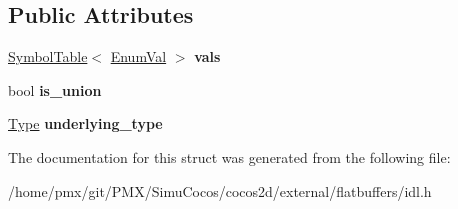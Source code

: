 \subsection*{Public Attributes}
\begin{DoxyCompactItemize}
\item 
\mbox{\label{structflatbuffers_1_1EnumDef_a3a7774d056864d4972b145df38910c8b}} 
\hyperlink{classflatbuffers_1_1SymbolTable}{Symbol\+Table}$<$ \hyperlink{structflatbuffers_1_1EnumVal}{Enum\+Val} $>$ {\bfseries vals}
\item 
\mbox{\label{structflatbuffers_1_1EnumDef_a70fa57575bf631dcc2860604574fd336}} 
bool {\bfseries is\+\_\+union}
\item 
\mbox{\label{structflatbuffers_1_1EnumDef_a94df2b0919d94f0d0bfc28c5be6fd6fb}} 
\hyperlink{structflatbuffers_1_1Type}{Type} {\bfseries underlying\+\_\+type}
\end{DoxyCompactItemize}


The documentation for this struct was generated from the following file\+:\begin{DoxyCompactItemize}
\item 
/home/pmx/git/\+P\+M\+X/\+Simu\+Cocos/cocos2d/external/flatbuffers/idl.\+h\end{DoxyCompactItemize}
